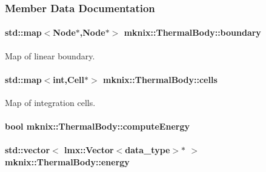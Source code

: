 \subsubsection{Member Data Documentation}
\hypertarget{classmknix_1_1_thermal_body_accad269fb2f0b891c66633011d396cfa}{
\paragraph[{boundary}]{\setlength{\rightskip}{0pt plus 5cm}std\-::map$<${\bf Node}$\ast$,{\bf Node}$\ast$$>$ mknix\-::\-Thermal\-Body\-::boundary\hspace{0.3cm}{\ttfamily [protected]}}}\label{classmknix_1_1_thermal_body_accad269fb2f0b891c66633011d396cfa}
Map of linear boundary. \hypertarget{classmknix_1_1_thermal_body_a2af2b78c8e31929211f88a5a49072c06}{
\paragraph[{cells}]{\setlength{\rightskip}{0pt plus 5cm}std\-::map$<$int,{\bf Cell}$\ast$$>$ mknix\-::\-Thermal\-Body\-::cells\hspace{0.3cm}{\ttfamily [protected]}}}\label{classmknix_1_1_thermal_body_a2af2b78c8e31929211f88a5a49072c06}
Map of integration cells. \hypertarget{classmknix_1_1_thermal_body_a097e16dfcc1491dc659608f1392a504f}{
\paragraph[{compute\-Energy}]{\setlength{\rightskip}{0pt plus 5cm}bool mknix\-::\-Thermal\-Body\-::compute\-Energy\hspace{0.3cm}{\ttfamily [protected]}}}\label{classmknix_1_1_thermal_body_a097e16dfcc1491dc659608f1392a504f}
\hypertarget{classmknix_1_1_thermal_body_aa5aa347f85714ea0766e2c1fddab4dad}{
\paragraph[{energy}]{\setlength{\rightskip}{0pt plus 5cm}std\-::vector$<$ lmx\-::\-Vector$<${\bf data\-\_\-type}$>$$\ast$ $>$ mknix\-::\-Thermal\-Body\-::energy\hspace{0.3cm}{\ttfamily [protected]}}}\label{classmknix_1_1_thermal_body_aa5aa347f85714ea0766e2c1fddab4dad}
